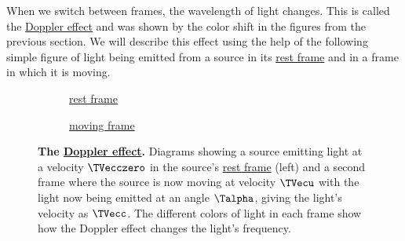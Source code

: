 When we switch between frames, the wavelength of light changes.
This is called the \hyperlink{def-doppler-effect}{Doppler effect} and was shown by the color shift in the figures from the previous section.
We will describe this effect using the help of the following simple figure of light being emitted from a source in its \hyperlink{def-proper-frame}{rest frame} and in a frame in which it is moving.

\begin{figure}[H]
	\begin{subfigure}{.49\textwidth}
    \centering
    \caption{\protect\hyperlink{def-proper-frame}{rest frame}}
\end{subfigure}
\begin{subfigure}{.49\textwidth}
    \centering
    \caption{\protect\hyperlink{def-Moving-Frame}{moving frame}}
\end{subfigure}
	\caption{\textbf{The \protect\hyperlink{def-doppler-effect}{Doppler effect}.} Diagrams showing a source emitting light at a velocity $\TVecczero $ in the source's \protect\hyperlink{def-proper-frame}{rest frame} (left) and a second frame where the source is now moving at velocity $\TVecu $ with the light now being emitted at an angle ${\Talpha }$, giving the light's velocity as ${\TVecc  }$. The different colors of light in each frame show how the Doppler effect changes the light's frequency.}
	\label{fig: Doppler effect}
\end{figure}


